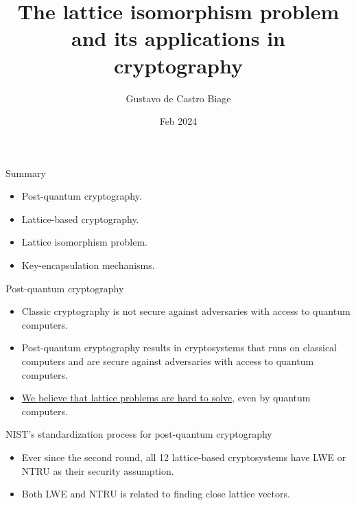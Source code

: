\documentclass[10pt]{beamer}
\title{The lattice isomorphism problem and its applications in cryptography}
\author{Gustavo de Castro Biage }
\date{Feb 2024}
\begin{document}
				\selectfont

\begin{frame}
				\titlepage{}
\end{frame}

\begin{frame}{Summary}
		\begin{itemize}
						\justifying
						\item Post-quantum cryptography.
						\item Lattice-based cryptography.
						\item Lattice isomorphism problem.
						\item Key-encapsulation mechanisms.
		\end{itemize}
\end{frame}

\begin{frame}{Post-quantum cryptography}
				\begin{itemize}
								\justifying
								\item Classic cryptography is not secure against adversaries with access to quantum computers.
								\item Post-quantum cryptography results in cryptosystems that runs on classical computers and are secure against adversaries with access to quantum computers.
								\item \underline{We believe that lattice problems are hard to solve}, even by quantum  computers.
				\end{itemize}
				\begin{block}{NIST's standardization process for post-quantum cryptography}\scriptsize
												\begin{itemize}
																\item Ever since the second round, all 12 lattice-based cryptosystems have LWE or NTRU as their security assumption.
																\item Both LWE and NTRU is related to finding close lattice vectors.
												\end{itemize}
				\end{block}
\end{frame}
\end{document}
